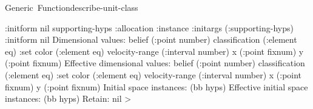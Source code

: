 \documentclass[10pt,twoside,english,pdftex]{article}
\begin{document}
\begin{functiondoc}{Generic~Function}{describe-unit-class}
\begin{example}
        :initform nil\goodpagebreak
      supporting-hyps
        :allocation :instance
        :initargs (:supporting-hyps)
        :initform nil\goodpagebreak
    Dimensional values:
      belief (:point number)
      classification (:element eq) :set
      color (:element eq)
      velocity-range (:interval number)
      x (:point fixnum)
      y (:point fixnum)\goodpagebreak
    Effective dimensional values:
      belief (:point number)
      classification (:element eq) :set
      color (:element eq)
      velocity-range (:interval number)
      x (:point fixnum)
      y (:point fixnum)\goodpagebreak
    Initial space instances:
      (bb hyps)
    Effective initial space instances:
      (bb hyps)
    Retain: nil
  >
\end{example}

\end{functiondoc}

\end{document}
